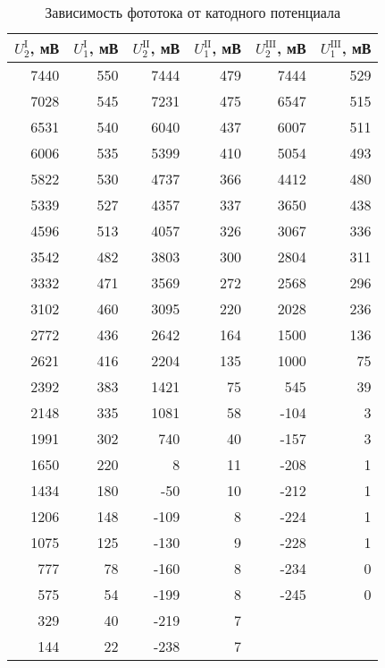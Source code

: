 \begin{table}[h!]
\caption{Зависимость фототока от катодного потенциала}
\centering
\begin{tabular}{rrrrrr}
\toprule
 $U_2^{\text{I}}$, мВ &  $U_1^{\text{I}}$, мВ &  
 $U_2^{\text{II}}$, мВ &  $U_1^{\text{II}}$, мВ & 
 $U_2^{\text{III}}$, мВ &  $U_1^{\text{III}}$, мВ \\
\midrule
  7440 &     550 &   7444 &     479 &   7444 &     529 \\
  7028 &     545 &   7231 &     475 &   6547 &     515 \\
  6531 &     540 &   6040 &     437 &   6007 &     511 \\
  6006 &     535 &   5399 &     410 &   5054 &     493 \\
  5822 &     530 &   4737 &     366 &   4412 &     480 \\
  5339 &     527 &   4357 &     337 &   3650 &     438 \\
  4596 &     513 &   4057 &     326 &   3067 &     336 \\
  3542 &     482 &   3803 &     300 &   2804 &     311 \\
  3332 &     471 &   3569 &     272 &   2568 &     296 \\
  3102 &     460 &   3095 &     220 &   2028 &     236 \\
  2772 &     436 &   2642 &     164 &   1500 &     136 \\
  2621 &     416 &   2204 &     135 &   1000 &      75 \\
  2392 &     383 &   1421 &      75 &    545 &      39 \\
  2148 &     335 &   1081 &      58 &   -104 &       3 \\
  1991 &     302 &    740 &      40 &   -157 &       3 \\
  1650 &     220 &      8 &      11 &   -208 &       1 \\
  1434 &     180 &    -50 &      10 &   -212 &       1 \\
  1206 &     148 &   -109 &       8 &   -224 &       1 \\
  1075 &     125 &   -130 &       9 &   -228 &       1 \\
   777 &      78 &   -160 &       8 &   -234 &       0 \\
   575 &      54 &   -199 &       8 &   -245 &       0 \\
   329 &      40 &   -219 &       7 &        &         \\
   144 &      22 &   -238 &       7 &        &         \\

\end{tabular}
\end{table}
